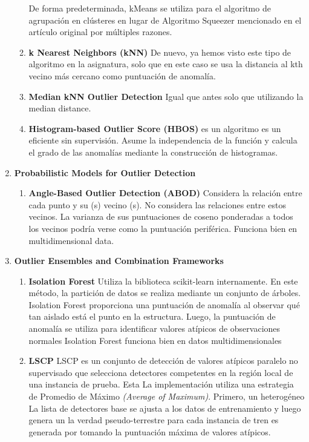 \documentclass[12pt,twoside]{report}
\begin{document}
\begin{enumerate}
\begin{enumerate}
     De forma predeterminada, kMeans se utiliza para el algoritmo de agrupación en clústeres en lugar de
     Algoritmo Squeezer mencionado en el artículo original por múltiples razones.
		\item \textbf{k Nearest Neighbors  (kNN)}  De nuevo, ya hemos visto este tipo de algoritmo en la asignatura, solo que en este caso se usa la distancia al kth vecino más cercano como puntuación de anomalía.
		\item \textbf{Median kNN Outlier Detection}  Igual que antes solo que utilizando la median distance.
		\item \textbf{Histogram-based Outlier Score (HBOS)} es un algoritmo es un eficiente sin supervisión. Asume la independencia de la función y calcula el grado de las anomalías mediante la construcción de histogramas.
	\end{enumerate}
	\item \textbf{Probabilistic Models for Outlier Detection}
	\begin{enumerate}
		\item \textbf{Angle-Based Outlier Detection (ABOD)} Considera la relación entre cada punto y su (s) vecino (s). No considera las relaciones entre estos vecinos. La varianza de sus puntuaciones de coseno ponderadas a todos los vecinos podría verse como la puntuación periférica. Funciona bien en multidimensional data.
	\end{enumerate}
	\item \textbf{Outlier Ensembles and Combination Frameworks}
	\begin{enumerate}
		\item \textbf{Isolation Forest} Utiliza la biblioteca scikit-learn internamente. En este método, la partición de datos se realiza mediante un conjunto de árboles. Isolation Forest proporciona una puntuación de anomalía al observar qué tan aislado está el punto en la estructura. Luego, la puntuación de anomalía se utiliza para identificar valores atípicos de observaciones normales
Isolation Forest funciona bien en datos multidimensionales
		\item \textbf{LSCP} LSCP es un conjunto de detección de valores atípicos paralelo no supervisado que selecciona
    detectores competentes en la región local de una instancia de prueba. Esta
    La implementación utiliza una estrategia de Promedio de Máximo \textit{(Average of Maximum)}. Primero, un heterogéneo
    La lista de detectores base se ajusta a los datos de entrenamiento y luego genera un
    la verdad pseudo-terrestre para cada instancia de tren es generada por
    tomando la puntuación máxima de valores atípicos.


\end{enumerate}
\end{enumerate}
\end{document}
